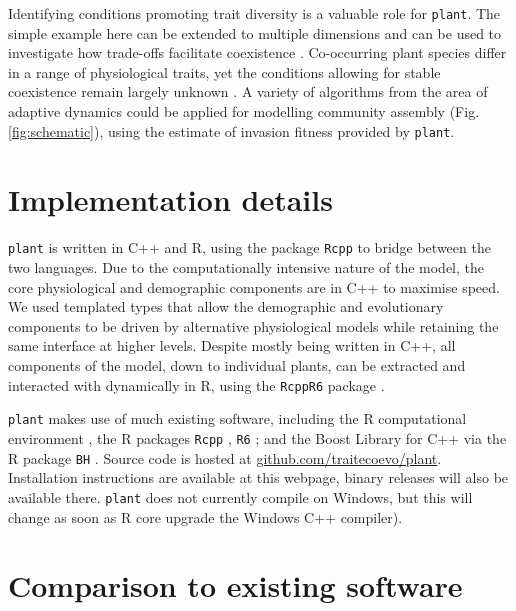 \documentclass[a4paper,11pt]{article}
\newcommand{\plant}{\texttt{plant}}
\begin{document}
Identifying conditions promoting trait diversity is a valuable role
for {\plant}. The simple example here can be extended to multiple dimensions
and can be used to investigate how trade-offs facilitate coexistence
\citep{Falster-2015}. Co-occurring plant species differ in a range of physiological
traits, yet the conditions allowing for stable coexistence remain largely
unknown \citep{Adler-2013}.
A variety of algorithms from the area of adaptive dynamics could be applied for modelling community assembly \citep[e.g.][]{Geritz-1998, Falster-2015}(Fig. \ref{fig:schematic}), using the estimate of invasion fitness provided by {\plant}.

\section{Implementation details}

{\plant} is written in C++ and R, using the package \texttt{Rcpp}
\citep{Eddelbuettel-2011, Eddelbuettel-2013} to bridge between the two
languages. Due to the computationally intensive nature of the model,
the core physiological and demographic components are in C++ to
maximise speed. We used templated types that allow the demographic and
evolutionary components to be driven by alternative physiological
models while retaining the same interface at higher levels. Despite
mostly being written in C++, all components of the model, down to
individual plants, can be extracted and interacted with dynamically in
R, using the \texttt{RcppR6} package \citep{RcppR6}.

{\plant} makes use of much existing software, including the R
computational environment \citep{R-2015}, the R packages \texttt{Rcpp}
\citep{Eddelbuettel-2011, Eddelbuettel-2013}, \texttt{R6}
\citep{Chang-2014}; and the Boost Library for C++
\citep{Schaling-2014} via the R package \texttt{BH}
\citep{Eddelbuettel-2015}. Source code is hosted at
\href{https://github.com/traitecoevo/plant}{github.com/traitecoevo/plant}.
Installation instructions are available at this webpage, binary
releases will also be available there.  {\plant} does not
currently compile on Windows, but this will change as soon as R core
upgrade the Windows C++ compiler).

\section{Comparison to existing software}
\end{document}
